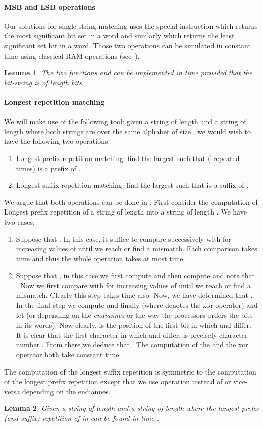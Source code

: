 \documentclass{article}
\newcommand{\?}{\mskip1.5mu}
\newtheorem{lemma}{Lemma}
\begin{document}
\paragraph{MSB and LSB operations}
Our solutions for single string matching uses the special instruction  which returns the most significant bit set in a word and similarly  which returns the least significant set bit in a word. 
Those two operations can be simulated in constant time using classical RAM operations (see~\cite{AHNR98,FW93,Brodnik93}).
\begin{lemma}
The two functions  and  
can be implemented in  time provided that the bit-string  is of length  bits.
\end{lemma}

\paragraph{Longest repetition matching}
We will make use of the following tool: given a string  of length  and a string  of length  where both strings are over the same alphabet of size , we would wish to have the following two operations: 
\begin{enumerate}
\item Longest prefix repetition matching: find the largest  such that  ( repeated  times) is a prefix of .
\item Longest suffix repetition matching: find the largest  such that  is a suffix of .
\end{enumerate}
We argue that both operations can be done in . First consider the computation of Longest prefix repetition of a string  of length  into a string  of length . We have two cases:
\begin{enumerate}
\item Suppose that . In this case, it suffice to compare successively  with  for increasing values of  until we reach  or find a mismatch. Each comparison takes time  and thus the whole operation takes at most  time. 
\item Suppose that , in this case we first compute  and then compute  and note that . Now we first compare  with  for increasing values of  until we reach  or find a mismatch. Clearly this step takes time  also. Now, we have determined that . In the final step we compute  and finally  (where  denotes the xor operator) and let  (or  depending on the \emph{endiannes} or the way the processors orders the bits in its words). Now clearly,  is the position of the first bit in which  and  differ. It is clear that the first character in which  and  differ, is precisely character number . From there we deduce that . The computation of the  and the xor operator both take constant time. 
\end{enumerate}
The computation of the longest suffix repetition is symmetric to the computation of the longest prefix repetition except that we use  operation instead of  or vice-versa depending on the endiannes. 
\begin{lemma}
Given a string  of length  and a string  of length  where  the longest prefix (and suffix) repetition of  in  can be found in time .
\end{lemma}
\end{document}
